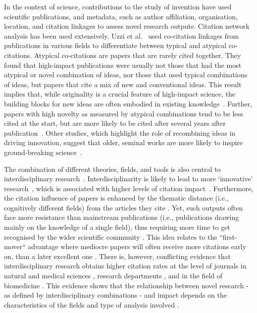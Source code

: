\documentclass[draft,final]{vutinfth} %
\begin{document}
In the context of science, contributions to the study of invention have used scientific publications, and metadata, such as author affiliation, organisation, location, and citation linkages to assess novel research outputs. Citation network analysis has been used extensively. Uzzi et al.~\cite{uzzi2013atypical} used co-citation linkages from publications in various fields to differentiate between typical and atypical co-citations. Atypical co-citations are papers that are rarely cited together. They found that high-impact publications were usually not those that had the most atypical or novel combination of ideas, nor those that used typical combinations of ideas, but papers that cite a mix of new and conventional ideas. This result implies that, while originality is a crucial feature of high-impact science, the building blocks for new ideas are often embodied in existing knowledge~\cite{uzzi2013atypical}. Further, papers with high novelty as measured by atypical combinations tend to be less cited at the start, but are more likely to be cited after several years after publication~\cite{stephan2017reviewers}. Other studies, which highlight the role of recombining ideas in driving innovation, suggest that older, seminal works are more likely to inspire ground-breaking science~\cite{kuhn1962structure}. 

The combination of different theories, fields, and tools is also central to interdisciplinary research~\cite{wagner2011approaches}. Interdisciplinarity is likely to lead to more `innovative' research~\cite{thurner2019role}, which is associated with higher levels of citation impact~\cite{lariviere2015long}. Furthermore, the citation influence of papers is enhanced by the thematic distance (i.e., cognitively different fields) from the articles they cite \cite{klavans2013towards}. Yet, such outputs often face more resistance than mainstream publications (i.e., publications drawing mainly on the knowledge of a single field), thus requiring more time to get recognised by the wider scientific community \cite{thurner2019role}. This idea relates to the ``first-mover`` advantage where mediocre papers will often receive more citations early on, than a later excellent one \cite{newman2009first}. There is, however, conflicting evidence that interdisciplinary research obtains higher citation rates at the level of journals in natural and medical sciences \cite{levitt2008multidisciplinary}, research departments \cite{rinia2002impact}, and in the field of biomedicine \cite{lariviere2010relationship}. 
This evidence shows that the relationship between novel research - as defined by interdisciplinary combinations - and impact depends on the characteristics of the fields and type of analysis involved \cite{lariviere2010relationship}.
\end{document}

